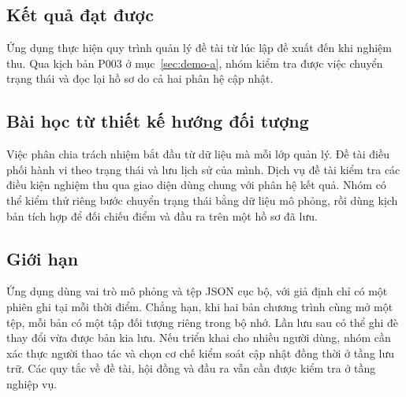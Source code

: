 \label{sec:conclusion}
\subsection{Kết quả đạt được}
Ứng dụng thực hiện quy trình quản lý đề tài từ lúc lập đề xuất đến khi nghiệm thu. Qua kịch bản P003 ở mục~\ref{sec:demo-a}, nhóm kiểm tra được việc chuyển trạng thái và đọc lại hồ sơ do cả hai phân hệ cập nhật.

\subsection{Bài học từ thiết kế hướng đối tượng}
Việc phân chia trách nhiệm bắt đầu từ dữ liệu mà mỗi lớp quản lý. Đề tài điều phối hành vi theo trạng thái và lưu lịch sử của mình. Dịch vụ đề tài kiểm tra các điều kiện nghiệm thu qua giao diện dùng chung với phân hệ kết quả. Nhóm có thể kiểm thử riêng bước chuyển trạng thái bằng dữ liệu mô phỏng, rồi dùng kịch bản tích hợp để đối chiếu điểm và đầu ra trên một hồ sơ đã lưu.

\subsection{Giới hạn}
Ứng dụng dùng vai trò mô phỏng và tệp JSON cục bộ, với giả định chỉ có một phiên ghi tại mỗi thời điểm. Chẳng hạn, khi hai bản chương trình cùng mở một tệp, mỗi bản có một tập đối tượng riêng trong bộ nhớ. Lần lưu sau có thể ghi đè thay đổi vừa được bản kia lưu. Nếu triển khai cho nhiều người dùng, nhóm cần xác thực người thao tác và chọn cơ chế kiểm soát cập nhật đồng thời ở tầng lưu trữ. Các quy tắc về đề tài, hội đồng và đầu ra vẫn cần được kiểm tra ở tầng nghiệp vụ.
